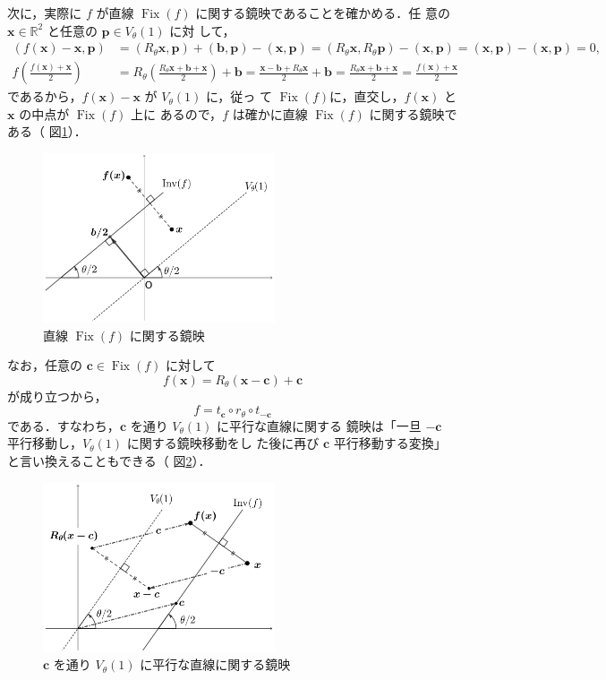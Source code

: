 \documentclass[11pt, uplatex, dvipdfmx, titlepage]{jsarticle}
\DeclareMathOperator{\Fix}{Fix}
\theoremstyle{definition}
\begin{document}
次に，実際に $f$ が直線 $\Fix(f)$ に関する鏡映であることを確かめる．任
意の $\bm{x} \in \mathbb{R}^2$ と任意の $\bm{p} \in V_{\theta}(1)$ に対
して，
\begin{align*}
  \left( f\left(\bm{x}\right) - \bm{x}, \bm{p}\right) 
  &= (R_{\theta}\bm{x}, \bm{p}) +(\bm{b},\bm{p})-(\bm{x},\bm{p})=(R_{\theta}\bm{x}, R_{\theta}\bm{p})-(\bm{x}, \bm{p})
  =(\bm{x},\bm{p}) - (\bm{x}, \bm{p})=0,\\
  f\left(\frac{f(\bm{x})+\bm{x}}{2}\right) 
  &= R_{\theta}\left(
    \frac{R_{\theta}\bm{x} + \bm{b} + \bm{x}}{2}\right) + \bm{b}
  =\frac{\bm{x}-\bm{b}+R_{\theta}\bm{x}}{2} + \bm{b}
  =\frac{R_{\theta}\bm{x}+\bm{b} + \bm{x}}{2} = \frac{f(\bm{x})+\bm{x}}{2}
\end{align*}
であるから，$f(\bm{x})-\bm{x}$ が $V_{\theta}(1)$ に，従っ
て $\Fix(f)$に，直交し，$f(\bm{x})$ と $\bm{x}$ の中点が $\Fix(f)$ 上に
あるので，$f$ は確かに直線 $\Fix(f)$ に関する鏡映である（
図\ref{fig:reflection2gen}）．
\begin{figure}[h]
  \centering
  \includegraphics[height=5cm]{pictures/reflection2gen.pdf}
  \caption{直線 $\Fix(f)$ に関する鏡映}
  \label{fig:reflection2gen}
\end{figure}

なお，任意の $\bm{c} \in \Fix(f)$ に対して
\[
  f(\bm{x}) =  R_{\theta}\left( \bm{x} - \bm{c}\right) + \bm{c}
\]
が成り立つから，
\[
  f = t_{\bm{c}} \circ r_{\theta} \circ t_{-\bm{c}}
\]
である．すなわち，$\bm{c}$ を通り $V_{\theta}(1)$ に平行な直線に関する
鏡映は「一旦 $-\bm{c}$ 平行移動し，$V_{\theta}(1)$ に関する鏡映移動をし
た後に再び $\bm{c}$ 平行移動する変換」と言い換えることもできる（
図\ref{fig:reflection2gen2}）．
\begin{figure}[h]
  \centering
  \includegraphics[height=5cm]{pictures/reflection2gen2.pdf}
  \caption{$\bm{c}$ を通り $V_{\theta}(1)$ に平行な直線に関する鏡映}
  \label{fig:reflection2gen2}
\end{figure}
\end{document}
